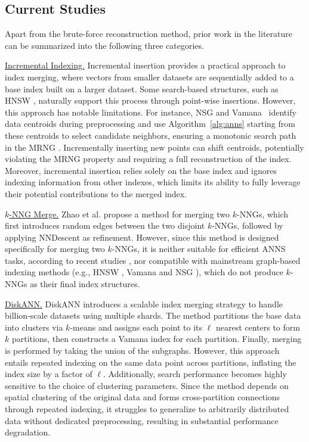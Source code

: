 \documentclass[acmsmall]{acmart}
\theoremstyle{remark}
\theoremstyle{definition}
\begin{document}
\subsection{Current Studies}
\label{subsec:currentStudies}

Apart from the brute-force reconstruction method, prior work in the literature can be summarized into the following three categories.

\noindent\underline{Incremental Indexing.} Incremental insertion provides a practical approach to index merging, where vectors from smaller datasets are sequentially added to a base index built on a larger dataset. Some search-based structures, such as HNSW \cite{malkov2018efficient}, naturally support this process through point-wise insertions. However, this approach has notable limitations. For instance, NSG \cite{fu2017fast} and Vamana~\cite{jayaram2019diskann} identify data centroids during preprocessing and use Algorithm~\ref{alg:anns} starting from these centroids to select candidate neighbors, ensuring a monotonic search path in the MRNG \cite{fu2017fast}. Incrementally inserting new points can shift centroids, potentially violating the MRNG property and requiring a full reconstruction of the index. Moreover, incremental insertion relies solely on the base index and ignores indexing information from other indexes, which limits its ability to fully leverage their potential contributions to the merged index.

\noindent\underline{$k$-NNG Merge.} Zhao et al. \cite{zhao2021merge} propose a method for merging two $k$-NNGs, which first introduces random edges between the two disjoint $k$-NNGs, followed by applying NNDescent \cite{dong2011efficient} as refinement. However, since this method is designed specifically for merging two $k$-NNGs, it is neither suitable for efficient ANNS tasks, according to recent studies \cite{li2019approximate,wang2021comprehensive}, nor compatible with mainstream graph-based indexing methods (e.g., HNSW \cite{malkov2018efficient}, Vamana \cite{jayaram2019diskann} and NSG \cite{fu2017fast}), which do not produce $k$-NNGs as their final index structures.

\noindent\underline{DiskANN.} DiskANN \cite{jayaram2019diskann} introduces a scalable index merging strategy to handle billion-scale datasets using multiple shards. The method partitions the base data into clusters via $k$-means and assigns each point to its $\ell$ nearest centers to form $k$ partitions, then constructs a Vamana index for each partition. Finally, merging is performed by taking the union of the subgraphs. However, this approach entails repeated indexing on the same data point across partitions, inflating the index size by a factor of $\ell$. Additionally, search performance becomes highly sensitive to the choice of clustering parameters. Since the method depends on spatial clustering of the original data and forms cross-partition connections through repeated indexing, it struggles to generalize to arbitrarily distributed data without dedicated preprocessing, resulting in substantial performance degradation.
\end{document}
